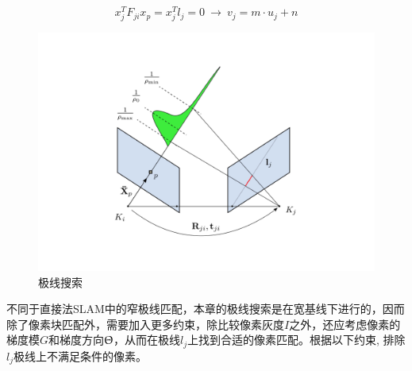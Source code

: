\begin{equation}
\label{equ4.1}
x_j^T F_{ji}x_p = x^T_jl_j=0 \  \rightarrow \  v_j = m \cdot u_j+n
\end{equation}

\begin{figure}
\centering
\includegraphics[scale=0.2,angle=-90]{figures/Fig4-2.pdf}
\caption{极线搜索}
\label{fig4.2}
\end{figure}

不同于直接法SLAM中的窄极线匹配，本章的极线搜索是在宽基线下进行的，因而除了像素块匹配外，需要加入更多约束，除比较像素灰度$I$之外，还应考虑像素的梯度模$G$和梯度方向$\Uptheta$，从而在极线$l_j$上找到合适的像素匹配。根据以下约束\upcite{[4.2]}, 排除$l_j$极线上不满足条件的像素。


